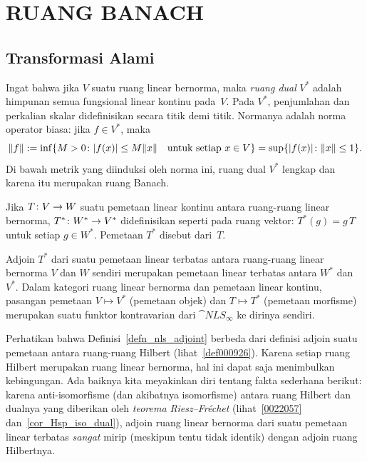 \chapter{RUANG BANACH}

\section{Transformasi Alami}
 Ingat bahwa jika $V$ suatu ruang linear bernorma, maka
\emph{ruang dual} $V^*$ adalah himpunan semua fungsional linear kontinu pada~$V$.  Pada $V^*$, penjumlahan dan
perkalian skalar didefinisikan secara titik demi titik. Normanya adalah norma operator biasa: jika $f \in V^*$, maka
 \[ \lVert f\rVert := \inf\{M > 0\colon \lvert f(x)\rvert \le M\lVert x\rVert\quad \text{untuk setiap $x \in V$}\} = \sup\{\lvert f(x)\rvert\colon \lVert x\rVert \le 1\}. \]
Di bawah metrik yang diinduksi oleh norma ini, ruang dual $V^*$ lengkap dan karena itu merupakan ruang Banach.

\begin{defn}\label{defn_nls_adjoint} Jika $T\colon V \rightarrow W$ suatu pemetaan linear kontinu antara ruang-ruang linear bernorma,
$T^*\colon W^* \rightarrow V^*$ didefinisikan seperti pada ruang vektor: $T^*(g) = g\,T$ untuk setiap
$g \in W^*$.  Pemetaan $T^*$ disebut
 dari~$T$.
\end{defn}

\begin{exam}\label{exam_dual_functor} Adjoin $T^*$ dari suatu pemetaan linear terbatas antara ruang-ruang linear bernorma $V$ dan
$W$ sendiri merupakan pemetaan linear terbatas antara $W^*$ dan~$V^*$. Dalam kategori ruang linear bernorma dan pemetaan linear
kontinu, pasangan pemetaan $V \mapsto V^*$ (pemetaan objek) dan $T \mapsto T^*$ (pemetaan morfisme) merupakan suatu funktor
kontravarian dari $\cat{NLS_\infty}$ ke dirinya sendiri.
\end{exam}

Perhatikan bahwa Definisi~\ref{defn_nls_adjoint} berbeda dari definisi adjoin suatu pemetaan
antara ruang-ruang Hilbert (lihat~\ref{def000926}).  Karena setiap ruang Hilbert merupakan ruang linear bernorma, hal ini dapat saja
menimbulkan kebingungan.  Ada baiknya kita meyakinkan diri tentang fakta sederhana berikut: karena anti-isomorfisme (dan akibatnya
isomorfisme) antara ruang Hilbert dan dualnya yang diberikan oleh \emph{teorema Riesz--Fr\'echet} (lihat~\ref{0022057}
dan~\ref{cor_Hsp_iso_dual}), adjoin ruang linear bernorma dari suatu pemetaan linear terbatas \emph{sangat} mirip (meskipun
tentu tidak identik) dengan adjoin ruang Hilbertnya.

